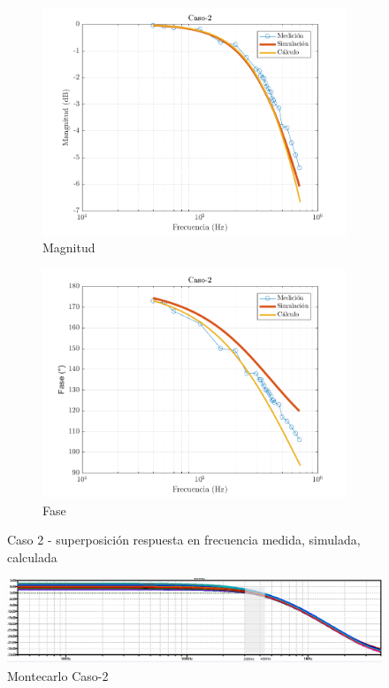 \documentclass[../../main.tex]{subfiles}
\begin{document}
\begin{figure}[H]
\centering
\begin{subfigure}[http]{0.49\textwidth}
\includegraphics[width=\textwidth]{Caso-2_mag_inv}
\caption{Magnitud}\label{fig=magInvC2}
\end{subfigure}
\begin{subfigure}[http]{0.49\textwidth}
\includegraphics[width=\textwidth]{Caso-2_fase_inv}
\caption{Fase}
\end{subfigure}
\caption{Caso 2 - superposición respuesta en  frecuencia medida, simulada, calculada}
\end{figure}

\begin{figure}[H]
\centering
\includegraphics[width=1\textwidth]{montecarlo_inv_c2}
\caption{Montecarlo Caso-2} \label{fig=mcInvC2}
\end{figure}
\end{document}
